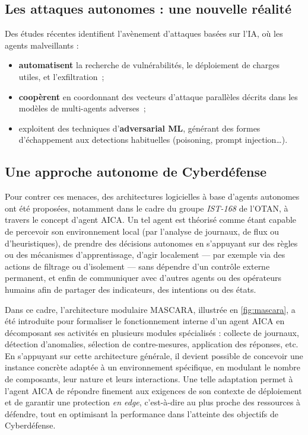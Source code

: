 \subsection*{Les attaques autonomes : une nouvelle réalité}

Des études récentes identifient l'avènement d'attaques basées sur l'\ac{IA}, où les agents malveillants :
\begin{itemize}
    \item \textbf{automatisent} la recherche de vulnérabilités, le déploiement de charges utiles, et l'exfiltration~\cite{AutoAttacker2024};
    \item \textbf{coopèrent} en coordonnant des vecteurs d'attaque parallèles décrits dans les modèles de multi-agents adverses~\cite{Falong2025};
    \item exploitent des techniques d'\textbf{adversarial ML}, générant des formes d'échappement aux detections habituelles (poisoning, prompt injection…).
\end{itemize}

\subsection*{Une approche autonome de Cyberdéfense}

Pour contrer ces menaces, des architectures logicielles à base d'agents autonomes ont été proposées, notamment dans le cadre du groupe \textit{IST-168} de l'\ac{OTAN}, à travers le concept d'agent \ac{AICA}. Un tel agent est théorisé comme étant capable de percevoir son environnement local (par l'analyse de journaux, de flux ou d'heuristiques), de prendre des décisions autonomes en s'appuyant sur des règles ou des mécanismes d'apprentissage, d'agir localement — par exemple via des actions de filtrage ou d'isolement — sans dépendre d'un contrôle externe permanent, et enfin de communiquer avec d'autres agents ou des opérateurs humains afin de partager des indicateurs, des intentions ou des états.

Dans ce cadre, l'architecture modulaire \ac{MASCARA}, illustrée en \autoref{fig:mascara}, a été introduite pour formaliser le fonctionnement interne d'un agent \ac{AICA} en décomposant ses activités en plusieurs modules spécialisés : collecte de journaux, détection d'anomalies, sélection de contre-mesures, application des réponses, etc. En s'appuyant sur cette architecture générale, il devient possible de concevoir une instance concrète adaptée à un environnement spécifique, en modulant le nombre de composants, leur nature et leurs interactions. Une telle adaptation permet à l'agent \ac{AICA} de répondre finement aux exigences de son contexte de déploiement et de garantir une protection {\em en edge}, c'est-à-dire au plus proche des ressources à défendre, tout en optimisant la performance dans l'atteinte des objectifs de Cyberdéfense.

